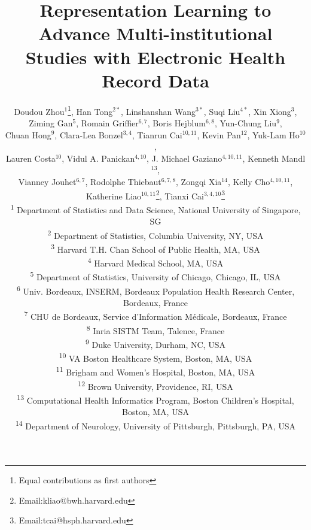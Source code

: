 \documentclass{article}
\begin{document}
\title{Representation Learning to Advance Multi-institutional Studies with Electronic Health Record Data}
\date{}

\author{Doudou Zhou$^{1}$\thanks{Equal contributions as first authors}, Han Tong$^{2*}$, Linshanshan Wang$^{3*}$, Suqi Liu$^{4*}$, Xin Xiong$^3$,\\
Ziming Gan$^5$, Romain Griffier$^{6,7}$,  Boris Hejblum$^{6,8}$, Yun-Chung Liu$^9$, \\
Chuan Hong$^9$, Clara-Lea Bonzel$^{3,4}$, Tianrun Cai$^{10,11}$, 
Kevin Pan$^{12}$, Yuk-Lam Ho$^{10}$, \\
Lauren Costa$^{10}$, Vidul A. Panickan$^{4,10}$, J. Michael Gaziano$^{4,10,11}$,  Kenneth Mandl$^{13}$, \\
Vianney Jouhet$^{6,7}$, Rodolphe Thiebaut$^{6,7,8}$, Zongqi Xia$^{14}$, Kelly Cho$^{4,10,11}$,
\\ Katherine Liao$^{10,11}$\thanks{Email:kliao@bwh.harvard.edu},  Tianxi Cai$^{3,4,10}$\thanks{Email:tcai@hsph.harvard.edu} \\
\textsuperscript{1} Department of Statistics and Data Science, National University of Singapore, SG \\
\textsuperscript{2} Department of Statistics, Columbia University, NY, USA \\
\textsuperscript{3} Harvard T.H. Chan School of Public Health, MA, USA \\ 
\textsuperscript{4} Harvard Medical School, MA, USA \\
\textsuperscript{5} Department of Statistics, University of Chicago, Chicago, IL, USA  \\
\textsuperscript{6} Univ. Bordeaux, INSERM, Bordeaux Population Health Research Center, Bordeaux, France \\
\textsuperscript{7} CHU de Bordeaux, Service d’Information Médicale,  Bordeaux, France \\
\textsuperscript{8} Inria SISTM Team, Talence, France \\
\textsuperscript{9} 
Duke University, Durham, NC, USA \\
\textsuperscript{10} VA Boston Healthcare System, Boston, MA, USA\\
\textsuperscript{11} Brigham and Women's Hospital, Boston, MA, USA \\ 
\textsuperscript{12} 
Brown University,  Providence, RI, USA \\
\textsuperscript{13} Computational Health Informatics Program, Boston Children’s Hospital, Boston, MA, USA\\
\textsuperscript{14} Department of Neurology, University of Pittsburgh, Pittsburgh, PA, USA
}
\end{document}
